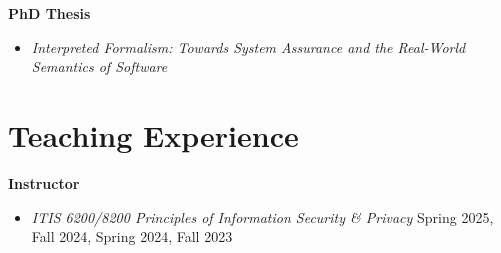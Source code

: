\documentclass[11pt]{article}
\begin{document}
\textbf{PhD Thesis}
\begin{itemize}
\item \textit{Interpreted Formalism: Towards System Assurance and the Real-World Semantics of Software}
\end{itemize}




\section{Teaching Experience}
\textbf{Instructor}
\begin{itemize}
  \item \emph{ITIS 6200/8200 Principles of Information Security \& Privacy} \hfill Spring 2025, Fall 2024, Spring 2024, Fall 2023
\end{itemize}


\end{document}
